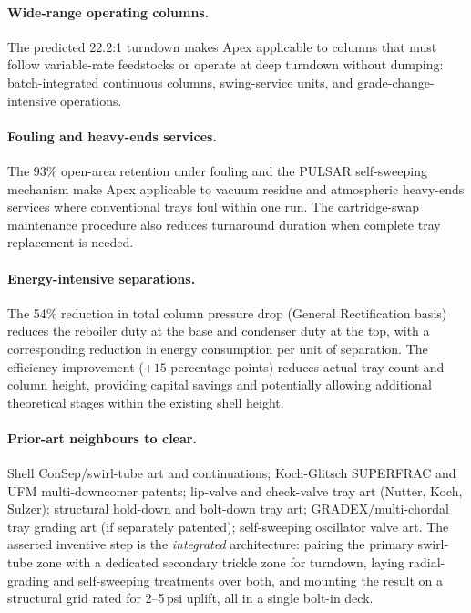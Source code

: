 \documentclass[11pt,letterpaper]{article}
\begin{document}
\paragraph{Wide-range operating columns.}
The predicted 22.2:1 turndown makes Apex applicable to columns that must
follow variable-rate feedstocks or operate at deep turndown without dumping:
batch-integrated continuous columns, swing-service units, and
grade-change-intensive operations.

\paragraph{Fouling and heavy-ends services.}
The 93\% open-area retention under fouling and the PULSAR self-sweeping
mechanism make Apex applicable to vacuum residue and atmospheric
heavy-ends services where conventional trays foul within one run.  The
cartridge-swap maintenance procedure also reduces turnaround duration when
complete tray replacement is needed.

\paragraph{Energy-intensive separations.}
The 54\% reduction in total column pressure drop (General Rectification basis)
reduces the reboiler duty at the base and condenser duty at the top, with a
corresponding reduction in energy consumption per unit of separation.  The
efficiency improvement ($+15$ percentage points) reduces actual tray count
and column height, providing capital savings and potentially allowing
additional theoretical stages within the existing shell height.

\paragraph{Prior-art neighbours to clear.}
Shell ConSep/swirl-tube art and continuations; Koch-Glitsch SUPERFRAC and UFM
multi-downcomer patents; lip-valve and check-valve tray art (Nutter, Koch,
Sulzer); structural hold-down and bolt-down tray art; GRADEX/multi-chordal
tray grading art (if separately patented); self-sweeping oscillator valve art.
The asserted inventive step is the \textit{integrated} architecture: pairing
the primary swirl-tube zone with a dedicated secondary trickle zone for
turndown, laying radial-grading and self-sweeping treatments over both, and
mounting the result on a structural grid rated for 2--5\,psi uplift, all in
a single bolt-in deck.
\end{document}
